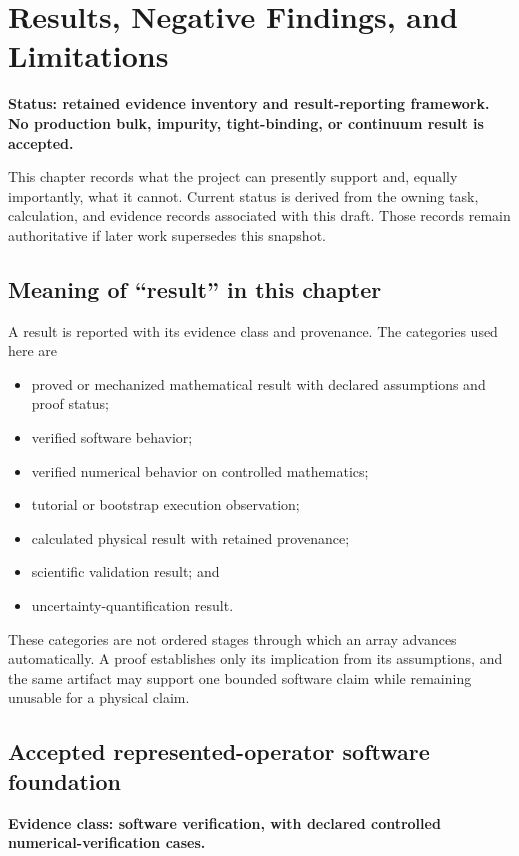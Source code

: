 \chapter{Results, Negative Findings, and Limitations}
\label{ch:results-and-limitations}

\textbf{Status: retained evidence inventory and result-reporting framework. No
production bulk, impurity, tight-binding, or continuum result is accepted.}

This chapter records what the project can presently support and, equally
importantly, what it cannot. Current status is derived from the owning task,
calculation, and evidence records associated with this draft. Those records
remain authoritative if later work supersedes this snapshot.

\section{Meaning of ``result'' in this chapter}

A result is reported with its evidence class and provenance. The categories used
here are

\begin{itemize}
  \item proved or mechanized mathematical result with declared assumptions and
    proof status;
  \item verified software behavior;
  \item verified numerical behavior on controlled mathematics;
  \item tutorial or bootstrap execution observation;
  \item calculated physical result with retained provenance;
  \item scientific validation result; and
  \item uncertainty-quantification result.
\end{itemize}

These categories are not ordered stages through which an array advances
automatically. A proof establishes only its implication from its assumptions,
and the same artifact may support one bounded software claim while
remaining unusable for a physical claim.

\section{Accepted represented-operator software foundation}

\textbf{Evidence class: software verification, with declared controlled
numerical-verification cases.}

